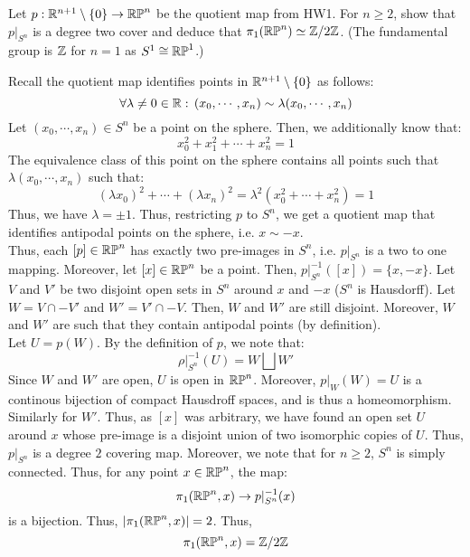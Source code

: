 \documentclass[12pt]{article}
\begin{document}


\begin{problab}{1}
    Let $p: \mathbb R^{n+1} \setminus \{0\} \to \mathbb{RP}^n$ be the quotient map from HW1. For $n \geq 2$, show that $p|_{S^n}$ is a degree two cover and deduce that $\pi_1(\mathbb{RP}^n) \simeq \mathbb{Z}/2\mathbb{Z}$. (The fundamental group is $\mathbb{Z}$ for $n=1$ as $S^1 \cong \mathbb{RP}^1$.)
\end{problab}
\begin{solu}
    Recall the quotient map identifies points in $\mathbb R^{n+1} \setminus \{0\}$ as follows: 
    \[ \forall \lambda \neq 0 \in \mathbb R: \, (x_0, \cdots, x_n) \sim \lambda (x_0, \cdots, x_n)\]
    Let $(x_0, \cdots, x_n) \in S^n$ be a point on the sphere. Then, we additionally know that:
    \[ x_0^2 + x_1^2 + \cdots + x_n^2 = 1\]
    The equivalence class of this point on the sphere contains all points such that $\lambda(x_0, \cdots, x_n)$ such that:
    \[ (\lambda x_0)^2 + \cdots + (\lambda x_n)^2 = \lambda^2 (x_0^2 + \cdots + x_n^2) = 1\]
    Thus, we have $\lambda = \pm 1$. Thus, restricting $p$ to $S^n$, we get a quotient map that identifies antipodal points on the sphere, i.e. $x \sim -x$. \\
    Thus, each $[p] \in \mathbb{RP}^n$ has exactly two pre-images in $S^n$, i.e. $p|_{S^n}$ is a two to one mapping. \bbni
    Moreover, let $[x] \in \mathbb{RP}^n$ be a point. Then, $p|_{S^n}^{-1}([x]) = \{x, -x\}$. Let $V$ and $V'$ be two disjoint open sets in $S^n$ around $x$ and $-x$ ($S^n$ is Hausdorff). Let $W = V \cap -V'$ and $W' = V' \cap -V$. Then, $W$ and $W'$ are still disjoint. Moreover, $W$ and $W'$ are such that they contain antipodal points (by definition). \\
    Let $U = p(W)$. By the definition of $p$, we note that:
    \[ \rho|_{S^n}^{-1}(U) = W \bigsqcup W'\]
    Since $W$ and $W'$ are open, $U$ is open in $\mathbb{RP}^n$. Moreover, $p|_W(W) = U$ is a continous bijection of compact Hausdroff spaces, and is thus a homeomorphism. Similarly for $W'$. Thus, as $[x]$ was arbitrary, we have found an open set $U$ around $x$ whose pre-image is a disjoint union of two isomorphic copies of $U$. Thus, $p|_{S^n}$ is a degree $2$ covering map. \bbni 
    Moreover, we note that for $n \geq 2$, $S^n$ is simply connected. Thus, for any point $x \in \mathbb{RP}^n$, the map: 
    \[ \pi_1(\mathbb{RP}^n, x) \to p|_{S^n}^{-1}(x)\]
    is a bijection. Thus, $|\pi_1(\mathbb{RP}^n, x)| = 2$. Thus, 
    \[ \pi_1(\mathbb{RP}^n, x) = \mathbb Z/2\mathbb Z\]

\end{solu}
\newpage
\end{document}
